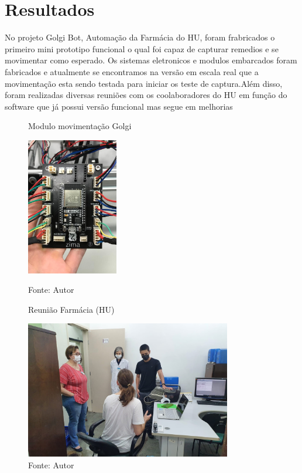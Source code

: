 \documentclass[]{politex}
\begin{document}
\part{Resultados}

No projeto Golgi Bot, Automação da Farmácia do HU, foram frabricados o primeiro mini prototipo funcional o qual foi capaz de capturar remedios e se movimentar como esperado. Os sistemas eletronicos e modulos embarcados foram fabricados e atualmente se encontramos na versão em escala real que a movimentação esta sendo testada para iniciar os teste de captura.Além disso, foram realizadas diversas reuniões com os coolaboradores do HU em função do software que já possui versão funcional mas segue em melhorias

\begin{figure}[h]
\centering
    \begin{minipage}{0.5\textwidth}
       \centering
        \caption{Modulo movimentação Golgi}
        \centering %
        \includegraphics[width=4cm]{images/modulo_golgi.jpeg}
        \caption*{Fonte: Autor}
        \label{figura: Modulo movimentação Golgi}
        
    \end{minipage}\hfill
    \begin{minipage}{0.5\textwidth}
        \centering
        \caption{Reunião Farmácia (HU)}
        \centering %
        \includegraphics[width=9cm]{images/reuni_golgi.jpg}
        \caption*{Fonte: Autor}
        \label{figura: Reunião Farmácia (HU)}
    \end{minipage}\hfill
\end{figure}
\end{document}
